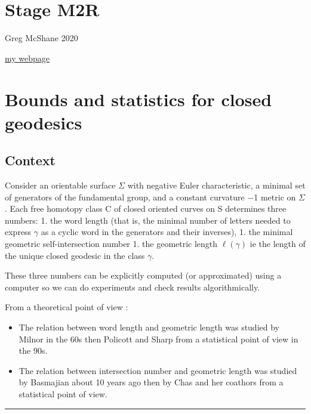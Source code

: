 \documentclass[
]{article}
\author{}
\date{}
\providecommand{\tightlist}{%
  \setlength{\itemsep}{0pt}\setlength{\parskip}{0pt}}
\begin{document}
\hypertarget{stage-m2r}{%
\section{Stage M2R}\label{stage-m2r}}

Greg McShane 2020

\href{https://macbuse.github.io/}{my webpage}

\hypertarget{bounds-and-statistics-for-closed-geodesics}{%
\section{Bounds and statistics for closed
geodesics}\label{bounds-and-statistics-for-closed-geodesics}}

\hypertarget{context}{%
\subsection{Context}\label{context}}

Consider an orientable surface \(\Sigma\) with negative Euler
characteristic, a minimal set of generators of the fundamental group,
and a constant curvature −1 metric on \(\Sigma\). Each free homotopy
class C of closed oriented curves on S determines three numbers: 1. the
word length (that is, the minimal number of letters needed to express
\(\gamma\) as a cyclic word in the generators and their inverses), 1.
the minimal geometric self-intersection number 1. the geometric length
\(\ell(\gamma)\) ie the length of the unique closed geodesic in the
class \(\gamma\).

These three numbers can be explicitly computed (or approximated) using a
computer so we can do experiments and check results algorithmically.

From a theoretical point of view :

\begin{itemize}
\tightlist
\item
  The relation between word length and geometric length was studied by
  Milnor in the 60s then Policott and Sharp from a statistical point of
  view in the 90s.
\item
  The relation between intersection number and geometric length was
  studied by Basmajian about 10 years ago then by Chas and her coathors
  from a statistical point of view.
\end{itemize}

\begin{center}\rule{0.5\linewidth}{0.5pt}\end{center}
\end{document}
